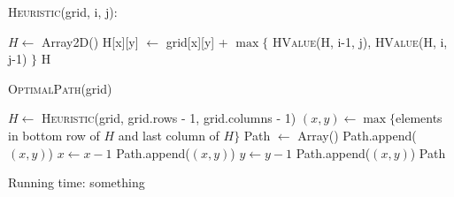 \documentclass[12pt,letterpaper]{article}
\begin{document}
\textsc{Heuristic}(grid, i, j):
\begin{algorithmic}
\State $H \gets$ Array2D()
		\State H[x][y] $\gets$ grid[x][y] + $\max \{$ \textsc{HValue}(H, i-1, j), \textsc{HValue}(H, i, j-1)  $\}$
	\EndFor
\EndFor
\State \Return H
\end{algorithmic}

\newpage

\textsc{OptimalPath}(grid)
\begin{algorithmic}
\State $H \gets$ \textsc{Heuristic}(grid, grid.rows - 1, grid.columns - 1)
\State $(x, y) \gets \max \{ $elements in bottom row of $H$ and last column of $H \}$
\State Path $\gets$ Array()
\State Path.append($(x, y)$)
		\State $x \gets x - 1$
		\State Path.append($(x, y)$)
	\Else
		\State $y \gets y - 1$
		\State Path.append($(x, y)$)
	\EndIf 
\EndWhile
\State \Return Path
\end{algorithmic}

Running time: something
\end{document}
